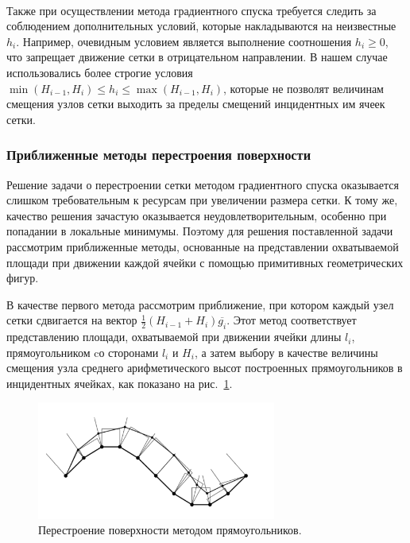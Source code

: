 \

Также при осуществлении метода градиентного спуска требуется следить за соблюдением дополнительных условий, которые накладываются на неизвестные $h_i$.
Например, очевидным условием является выполнение соотношения $h_i \ge 0$, что запрещает движение сетки в отрицательном направлении.
В нашем случае использовались более строгие условия $\min(H_{i - 1}, H_i) \le h_i \le \max(H_{i - 1}, H_i)$, которые не позволят величинам смещения узлов сетки выходить за пределы смещений инцидентных им ячеек сетки.

\subsubsection{Приближенные методы перестроения поверхности}

Решение задачи о перестроении сетки методом градиентного спуска оказывается слишком требовательным к ресурсам при увеличении размера сетки.
К тому же, качество решения зачастую оказывается неудовлетворительным, особенно при попадании в локальные минимумы.
Поэтому для решения поставленной задачи рассмотрим приближенные методы, основанные на представлении охватываемой площади при движении каждой ячейки с помощью примитивных геометрических фигур.

В качестве первого метода рассмотрим приближение, при котором каждый узел сетки сдвигается на вектор $\frac{1}{2}(H_{i - 1} + H_i)\overline{g_i}$.
Этот метод соответствует представлению площади, охватываемой при движении ячейки длины $l_i$, прямоугольником cо сторонами $l_i$ и $H_i$, а затем выбору в качестве величины смещения узла среднего арифметического высот построенных прямоугольников в инцидентных ячейках, как показано на рис.~\ref{fig:text_1_remesh_2d_grid_rectangles}.

\begin{figure}[h]
\onelinecaptionstrue
\centering
\includegraphics[width=0.7\textwidth]{pics/text_1_remesh_2d/grid_rectangles.pdf}
\caption{Перестроение поверхности методом прямоугольников.}
\label{fig:text_1_remesh_2d_grid_rectangles}
\end{figure}


